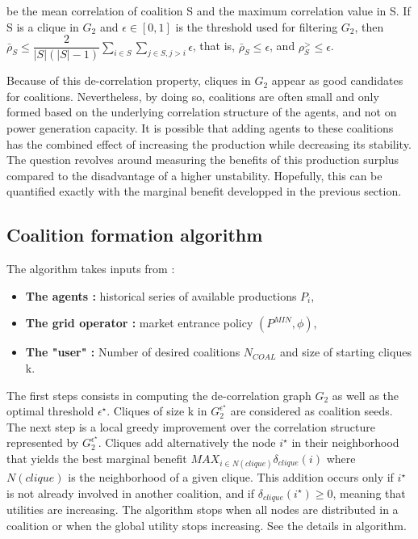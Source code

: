 \documentclass[conference]{IEEEtran}
\begin{document}
be the mean correlation of coalition S and the maximum correlation value in S. If S is a clique in $ G_{2} $ and $ \epsilon \in [0,1] $ is the threshold used for filtering $ G_{2} $, then $ \bar{\rho}_{S} \leq \dfrac{2}{|S|(|S|-1)} \sum_{i \in S} \sum_{j \in S, j>i} \epsilon $, that is, $ \bar{\rho}_{S} \leq \epsilon $, and $ \rho_{S}^{>} \leq \epsilon $.

Because of this de-correlation property, cliques in $ G_{2} $ appear as good candidates for coalitions. Nevertheless, by doing so, coalitions are often small and only formed based on the underlying correlation structure of the agents, and not on power generation capacity. It is possible that adding agents to these coalitions has the combined effect of increasing the production while decreasing its stability. The question revolves around measuring the benefits of this production surplus compared to the disadvantage of a higher unstability. Hopefully, this can be quantified exactly with the marginal benefit developped in the previous section.


\subsection{Coalition formation algorithm}

The algorithm takes inputs from :
\begin{itemize}
	\item \textbf{The agents :} historical series of available productions $P_{i}$, 
	\item \textbf{The grid operator :} market entrance policy $ (P^{MIN},\phi) $,
	\item \textbf{The "user" :} Number of desired coalitions $ N_{COAL} $ and size of starting cliques k.
\end{itemize} 
The first steps consists in computing the de-correlation graph $ G_{2} $ as well as the optimal threshold $ \epsilon^{\star} $. Cliques of size k in $ G_{2}^{\epsilon^{\star}} $ are considered as coalition seeds. The next step is a local greedy improvement over the correlation structure represented by  $ G_{2}^{\epsilon^{\star}} $. Cliques add alternatively the node $ i^{\star} $ in their neighborhood that yields the best marginal benefit $ MAX_{ i \in N(clique) } \delta_{clique}(i) $ where $ N(clique) $ is the neighborhood of a given clique. This addition occurs only if $ i^{\star} $ is not already involved in another coalition, and if $ \delta_{clique}(i^{\star}) \geq 0 $, meaning that utilities are increasing. The algorithm stops when all nodes are distributed in a coalition or when the global utility stops increasing. See the details in algorithm.
\end{document}

